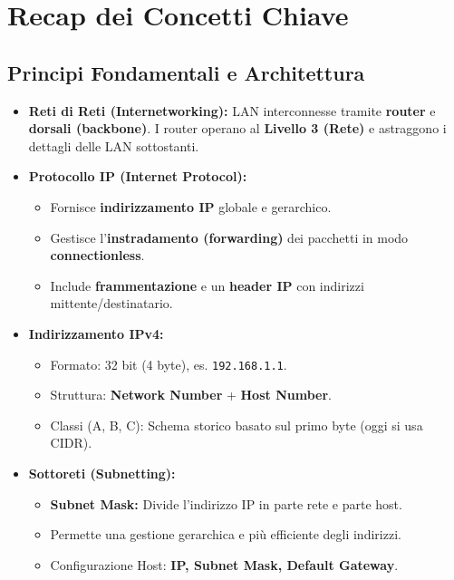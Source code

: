 \section{Recap dei Concetti Chiave}

\subsection{Principi Fondamentali e Architettura}
\begin{itemize}
    \item \textbf{Reti di Reti (Internetworking):} LAN interconnesse tramite \textbf{router} e \textbf{dorsali (backbone)}. I router operano al \textbf{Livello 3 (Rete)} e astraggono i dettagli delle LAN sottostanti.
    \item \textbf{Protocollo IP (Internet Protocol):}
    \begin{itemize}
        \item Fornisce \textbf{indirizzamento IP} globale e gerarchico.
        \item Gestisce l'\textbf{instradamento (forwarding)} dei pacchetti in modo \textbf{connectionless}.
        \item Include \textbf{frammentazione} e un \textbf{header IP} con indirizzi mittente/destinatario.
    \end{itemize}
    \item \textbf{Indirizzamento IPv4:}
    \begin{itemize}
        \item Formato: 32 bit (4 byte), es. \texttt{192.168.1.1}.
        \item Struttura: \textbf{Network Number} + \textbf{Host Number}.
        \item Classi (A, B, C): Schema storico basato sul primo byte (oggi si usa CIDR).
    \end{itemize}
    \item \textbf{Sottoreti (Subnetting):}
    \begin{itemize}
        \item \textbf{Subnet Mask:} Divide l'indirizzo IP in parte rete e parte host.
        \item Permette una gestione gerarchica e più efficiente degli indirizzi.
        \item Configurazione Host: \textbf{IP, Subnet Mask, Default Gateway}.
    \end{itemize}
\end{itemize}

